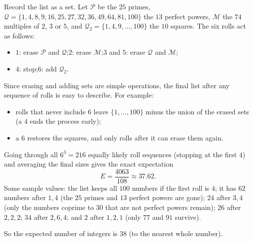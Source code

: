 Record the list as a set. Let $\mathcal P$ be the $25$ primes, $\mathcal Q=\{1,4,8,9,16,25,27,32,36,49,64,81,100\}$ the $13$ perfect powers, $\mathcal M$ the $74$ multiples of $2$, $3$ or $5$, and $\mathcal Q_2=\{1,4,9,\dots,100\}$ the $10$ squares. The six rolls act as follows:
\begin{itemize}
\item $1$: erase $\mathcal P$ and $\mathcal Q$;\quad $2$: erase $\mathcal M$;\quad $3$ and $5$: erase $\mathcal Q$ and $\mathcal M$;
\item $4$: stop;\quad $6$: add $\mathcal Q_2$.
\end{itemize}
Since erasing and adding sets are simple operations, the final list after any sequence of rolls is easy to describe. For example:
\begin{itemize}
\item rolls that never include $6$ leave $\{1,\dots,100\}$ minus the union of the erased sets (a $4$ ends the process early);
\item a $6$ restores the squares, and only rolls after it can erase them again.
\end{itemize}
Going through all $6^3=216$ equally likely roll sequences (stopping at the first $4$) and averaging the final sizes gives the exact expectation
\[
E=\dfrac{4063}{108}\approx37.62 .
\]
Some sample values: the list keeps all $100$ numbers if the first roll is $4$; it has $62$ numbers after $1,4$ (the $25$ primes and $13$ perfect powers are gone); $24$ after $3,4$ (only the numbers coprime to $30$ that are not perfect powers remain); $26$ after $2,2,2$; $34$ after $2,6,4$; and $2$ after $1,2,1$ (only $77$ and $91$ survive).

So the expected number of integers is $\boxed{38}$ (to the nearest whole number).
